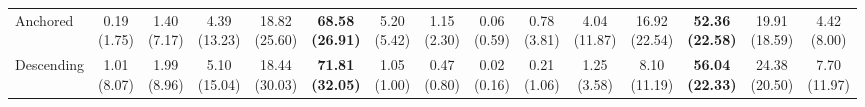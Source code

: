 {\begin{tabular}{l|ccccccc|ccccccc}
Anchored & \makecell{0.19 \\ (1.75)} & \makecell{1.40 \\ (7.17)} & \makecell{4.39 \\ (13.23)} & \makecell{18.82 \\ (25.60)} & \cellcolor[HTML]{C8E6C9}\bfseries \makecell{68.58 \\ (26.91)} & \makecell{5.20 \\ (5.42)} & \makecell{1.15 \\ (2.30)} & \makecell{0.06 \\ (0.59)} & \makecell{0.78 \\ (3.81)} & \makecell{4.04 \\ (11.87)} & \makecell{16.92 \\ (22.54)} & \cellcolor[HTML]{C8E6C9}\bfseries \makecell{52.36 \\ (22.58)} & \makecell{19.91 \\ (18.59)} & \makecell{4.42 \\ (8.00)} \\
Descending & \makecell{1.01 \\ (8.07)} & \makecell{1.99 \\ (8.96)} & \makecell{5.10 \\ (15.04)} & \makecell{18.44 \\ (30.03)} & \cellcolor[HTML]{C8E6C9}\bfseries \makecell{71.81 \\ (32.05)} & \makecell{1.05 \\ (1.00)} & \makecell{0.47 \\ (0.80)} & \makecell{0.02 \\ (0.16)} & \makecell{0.21 \\ (1.06)} & \makecell{1.25 \\ (3.58)} & \makecell{8.10 \\ (11.19)} & \cellcolor[HTML]{C8E6C9}\bfseries \makecell{56.04 \\ (22.33)} & \makecell{24.38 \\ (20.50)} & \makecell{7.70 \\ (11.97)} \\
\bottomrule
\end{tabular}}
